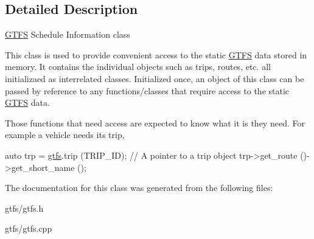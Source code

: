 \subsection{Detailed Description}
\hyperlink{classgtfs_1_1GTFS}{G\+T\+FS} Schedule Information class

This class is used to provide convenient access to the static \hyperlink{classgtfs_1_1GTFS}{G\+T\+FS} data stored in memory. It contains the individual objects such as trips, routes, etc. all initializaed as interrelated classes. Initialized once, an object of this class can be passed by reference to any functions/classes that require access to the static \hyperlink{classgtfs_1_1GTFS}{G\+T\+FS} data.

Those functions that need access are expected to know what it is they need. For example a vehicle needs it\textquotesingle{}s trip, 
\begin{DoxyCode}
\textcolor{keyword}{auto} trp = \hyperlink{namespacegtfs}{gtfs}.trip (TRIP\_ID); \textcolor{comment}{// A pointer to a trip object}
trp->get\_route ()->get\_short\_name ();
\end{DoxyCode}
 

The documentation for this class was generated from the following files\+:\begin{DoxyCompactItemize}
\item 
gtfs/gtfs.\+h\item 
gtfs/gtfs.\+cpp\end{DoxyCompactItemize}
